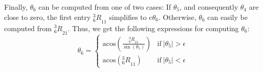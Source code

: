 \documentclass[twoside]{article}
\renewcommand{\c}{\text{c}}
\newcommand{\R}[2]{\mbox{$_{#2}^{#1}{R}$}}
\begin{document}
Finally, $\theta_6$ can be computed from one of two cases: If $\theta_5$, and
consequently $\theta_4$ are close to zero, the first entry $\R{3}{6}_{11}$ simplifies to
$\c\theta_6$. Otherwise, $\theta_6$ can easily be computed from $\R{3}{6}_{21}$.
Thus, we get the following expressions for computing $\theta_6$:
\begin{equation}
  \theta_6 =
  \begin{cases}
     \text{acos}\left(\frac{\R{3}{6}_{21}}{\sin(\theta_5)}\right) & \text{if}\ |\theta_5| > \epsilon \\
     \text{acos}\left(\R{3}{6}_{11}\right)                & \text{if}\ |\theta_5| < \epsilon
  \end{cases}
\end{equation}



%
%
\end{document}
